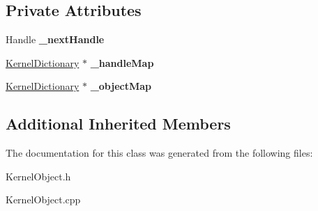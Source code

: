 \subsection*{Private Attributes}
\begin{DoxyCompactItemize}
\item 
\mbox{\label{class_object_mapper_a10580cef6df5d68294f73b32c045152a}} 
Handle {\bfseries \+\_\+next\+Handle}
\item 
\mbox{\label{class_object_mapper_ac2509ce49bb0e371d53fd7ed4cd0d39f}} 
\hyperlink{class_kernel_dictionary}{Kernel\+Dictionary} $\ast$ {\bfseries \+\_\+handle\+Map}
\item 
\mbox{\label{class_object_mapper_a7d92f6ba51e30a9fe222218cf9c82dd0}} 
\hyperlink{class_kernel_dictionary}{Kernel\+Dictionary} $\ast$ {\bfseries \+\_\+object\+Map}
\end{DoxyCompactItemize}
\subsection*{Additional Inherited Members}


The documentation for this class was generated from the following files\+:\begin{DoxyCompactItemize}
\item 
Kernel\+Object.\+h\item 
Kernel\+Object.\+cpp\end{DoxyCompactItemize}
